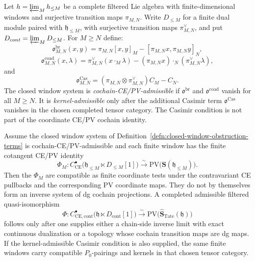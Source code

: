 \begin{defn}
\label{defn:closed-window-obstruction-terms}
  Let \(\mathfrak h=\varprojlim_M\mathfrak h_{\leq M}\) be a complete
  filtered Lie algebra with finite-dimensional windows and surjective
  transition maps \(\pi_{M,N}\).  Write
  \(D_{\leq M}\) for a finite dual module paired with
  \(\mathfrak h_{\leq M}\), with surjective transition maps
  \(\pi^\vee_{M,N}\), and put
  \(D_{\mathrm{cont}}=\varprojlim_MD_{\leq M}\).  For \(M\geq N\)
  define:
  \[
    \mathfrak o^{\mathrm{br}}_{M,N}(x,y)
      =\pi_{M,N}[x,y]_M-[\pi_{M,N}x,\pi_{M,N}y]_N,
  \]
  \[
    \mathfrak o^{\mathrm{coad}}_{M,N}(x,\lambda)
      =\pi^\vee_{M,N}(x\cdot_M\lambda)
       -(\pi_{M,N}x)\cdot_N(\pi^\vee_{M,N}\lambda),
  \]
  and
  \[
    \mathfrak o^{\mathrm{Cas}}_{M,N}
      =(\pi_{M,N}\otimes\pi^\vee_{M,N})C_M-C_N .
  \]
  The closed window system is \emph{cochain-CE/PV-admissible} if
  \(\mathfrak o^{\mathrm{br}}\) and \(\mathfrak o^{\mathrm{coad}}\)
  vanish for all \(M\geq N\).  It is
  \emph{kernel-admissible} only after the additional Casimir term
  \(\mathfrak o^{\mathrm{Cas}}\) vanishes in the chosen completed tensor
  category.  The Casimir condition is not part of the coordinate CE/PV
  cochain identity.
\end{defn}

\begin{lem}
\label{lem:closed-ce-pv-window-limit}
  Assume the closed window system of
  Definition~\ref{defn:closed-window-obstruction-terms} is
  cochain-CE/PV-admissible and each finite window has the finite cotangent
  CE/PV identity
  \[
    \Phi_M\colon
    C^\bullet_{\mathrm{CE}}\bigl(\mathfrak h_{\leq M}\ltimes
      D_{\leq M}[1]\bigr)
    \xrightarrow{\sim}
    \mathrm{PV}\bigl(\mathbf S(\mathfrak h_{\leq M})\bigr).
  \]
  Then the \(\Phi_M\) are compatible as finite coordinate tests under the
  contravariant CE pullbacks and the corresponding PV coordinate maps.
  They do not by themselves form an inverse system of dg cochain
  projections.  A completed admissible filtered quasi-isomorphism
  \[
    \Phi\colon
    C^\bullet_{\mathrm{CE},\mathrm{cont}}
      \bigl(\mathfrak h\ltimes D_{\mathrm{cont}}[1]\bigr)
    \xrightarrow{\sim}
    \mathrm{PV}\bigl(\widehat{\mathbf S}_{\mathrm{Tate}}(\mathfrak h)\bigr)
  \]
  follows only after one supplies either a chain-side inverse limit with
  exact continuous dualization or a topology whose cochain transition maps
  are dg maps.  If the kernel-admissible Casimir condition is also
  supplied, the same finite windows carry compatible \(P_0\)-pairings and
  kernels in that chosen tensor category.
\end{lem}

